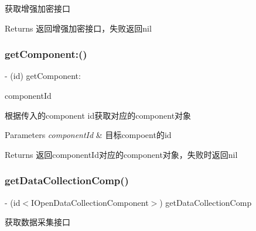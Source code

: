 获取增强加密接口

\begin{DoxyReturn}{Returns}
返回增强加密接口，失败返回nil 
\end{DoxyReturn}
\mbox{\label{interface_open_security_guard_manager_aab2df8eb76a8764540a05a04c2869755}} 
\subsubsection{\texorpdfstring{get\+Component\+:()}{getComponent:()}}
{\footnotesize\ttfamily -\/ (id) get\+Component\+: \begin{DoxyParamCaption}\item[{(Open\+Security\+Guard\+Component\+ID)}]{component\+Id }\end{DoxyParamCaption}}

根据传入的component id获取对应的component对象


\begin{DoxyParams}{Parameters}
{\em component\+Id} & 目标compoent的id\\
\hline
\end{DoxyParams}
\begin{DoxyReturn}{Returns}
返回component\+Id对应的component对象，失败时返回nil 
\end{DoxyReturn}
\mbox{\label{interface_open_security_guard_manager_add8fec4ef1682782cd1ab2745deea1f4}} 
\subsubsection{\texorpdfstring{get\+Data\+Collection\+Comp()}{getDataCollectionComp()}}
{\footnotesize\ttfamily -\/ (id$<$I\+Open\+Data\+Collection\+Component$>$) get\+Data\+Collection\+Comp \begin{DoxyParamCaption}{ }\end{DoxyParamCaption}}

获取数据采集接口


